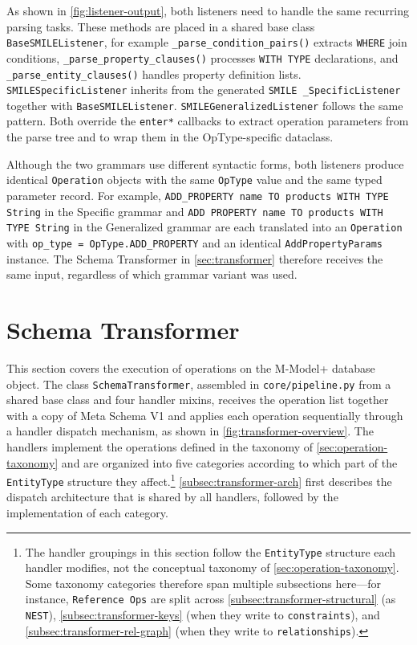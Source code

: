   As shown in \autoref{fig:listener-output}, both listeners need to handle
  the same recurring parsing tasks. These methods are placed in a shared
  base class \texttt{BaseSMILEListener}, for example
  \texttt{\_parse\_condition\_pairs()} extracts \texttt{WHERE} join
  conditions, \texttt{\_parse\_property\_clauses()} processes
  \texttt{WITH TYPE} declarations, and \texttt{\_parse\_entity\_clauses()}
  handles property definition lists. \texttt{SMILESpecificListener} inherits
  from the generated \texttt{SMILE \_SpecificListener} together with
  \texttt{BaseSMILEListener}. \texttt{SMILEGeneralizedListener} follows the
  same pattern. Both override the \texttt{enter*} callbacks to extract
  operation parameters from the parse tree and to wrap them in the
  OpType-specific dataclass.

  Although the two grammars use different syntactic forms, both listeners
  produce identical \texttt{Operation} objects with the same \texttt{OpType}
  value and the same typed parameter record. For example,
  \texttt{ADD\_PROPERTY name TO products WITH TYPE String} in the Specific
  grammar and \texttt{ADD PROPERTY name TO products WITH TYPE String} in
  the Generalized grammar are each translated into an \texttt{Operation}
  with \texttt{op\_type = OpType.ADD\_PROPERTY} and an identical
  \texttt{AddPropertyParams} instance. The Schema Transformer in
  \autoref{sec:transformer} therefore receives the same input, regardless
  of which grammar variant was used.


\section{Schema Transformer}\label{sec:transformer}

  This section covers the execution of operations on the M-Model+ database
  object. The class \texttt{SchemaTransformer}, assembled in \texttt{core/pipeline.py} from a shared base class and four handler mixins, receives
  the operation list together with a copy of Meta Schema V1 and applies
  each operation sequentially through a handler dispatch mechanism, as
  shown in \autoref{fig:transformer-overview}. The handlers implement the
  operations defined in the taxonomy of \autoref{sec:operation-taxonomy}
  and are organized into five categories according to which part of the
  \texttt{EntityType} structure they affect.\footnote{The handler
  groupings in this section follow the \texttt{EntityType} structure
  each handler modifies, not the conceptual taxonomy of
  \autoref{sec:operation-taxonomy}. Some taxonomy categories therefore
  span multiple subsections here—for instance, \texttt{Reference Ops}
  are split across \autoref{subsec:transformer-structural}
  (as \texttt{NEST}), \autoref{subsec:transformer-keys} (when they write
  to \texttt{constraints}), and \autoref{subsec:transformer-rel-graph}
  (when they write to \texttt{relationships}).}
  \autoref{subsec:transformer-arch} first describes the dispatch
  architecture that is shared by all handlers, followed by the
  implementation of each category.


